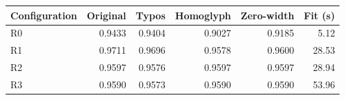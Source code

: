 \par\noindent
\begin{tabularx}{\linewidth}{@{}Yrrrrr@{}}
\toprule
Configuration & Original & Typos & Homoglyph & Zero-width & Fit (s) \\
\midrule
R0 & 0.9433 & 0.9404 & 0.9027 & 0.9185 & 5.12 \\
R1 & 0.9711 & 0.9696 & 0.9578 & 0.9600 & 28.53 \\
R2 & 0.9597 & 0.9576 & 0.9597 & 0.9597 & 28.94 \\
R3 & 0.9590 & 0.9573 & 0.9590 & 0.9590 & 53.96 \\
\bottomrule
\end{tabularx}
\par

